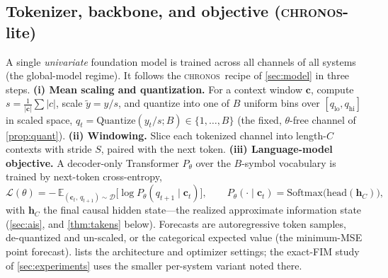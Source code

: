 \documentclass[10pt]{article}
\theoremstyle{plain}
\theoremstyle{definition}
\theoremstyle{remark}
\newcommand{\E}{\mathbb{E}}
\newcommand{\Chronos}{\textsc{chronos}}
\begin{document}
\subsection{Tokenizer, backbone, and objective (\Chronos-lite)}
A single \emph{univariate} foundation model is trained across all channels of all
systems (the global-model regime). It follows the \Chronos\ recipe of
\cref{sec:model} in three steps. \textbf{(i) Mean scaling and quantization.} For a
context window $\mathbf c$, compute $s=\tfrac1{|\mathbf c|}\sum|c|$, scale
$\tilde y=y/s$, and quantize into one of $B$ uniform bins over $[q_{\mathrm{lo}},
q_{\mathrm{hi}}]$ in scaled space, $q_t=\mathrm{Quantize}(y_t/s;B)\in\{1,\dots,B\}$
(the fixed, $\theta$-free channel of \cref{prop:quant}). \textbf{(ii)
Windowing.} Slice each tokenized channel into length-$C$ contexts with stride $S$,
paired with the next token. \textbf{(iii) Language-model objective.} A
decoder-only Transformer $P_\theta$ over the $B$-symbol vocabulary is trained by
next-token cross-entropy,
\begin{equation}
 \mathcal L(\theta)=-\,\E_{(\mathbf c_t,\,q_{t+1})\sim\mathcal D}
   \big[\log P_\theta(q_{t+1}\mid \mathbf c_t)\big],\qquad
 P_\theta(\cdot\mid\mathbf c_t)=\mathrm{Softmax}\big(\mathrm{head}(\mathbf h_C)\big),
 \label{eq:ce}
\end{equation}
with $\mathbf h_C$ the final causal hidden state---the realized approximate
information state (\cref{sec:ais}, and \cref{thm:takens} below). Forecasts are
autoregressive token samples, de-quantized and un-scaled, or the categorical
expected value (the minimum-MSE point forecast).  lists the
architecture and optimizer settings; the exact-FIM study of \cref{sec:experiments}
uses the smaller per-system variant noted there.
\end{document}
